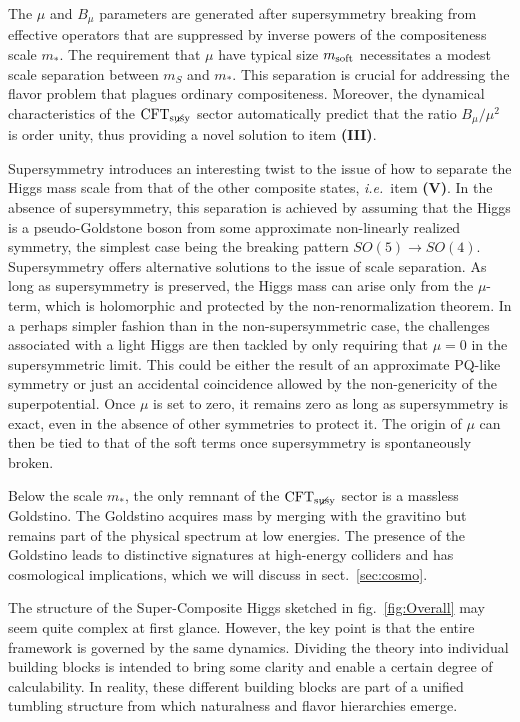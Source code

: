 \documentclass[a4paper,12pt]{article}
\def\fig#1{fig.~\ref{#1}}
\def\fig#1{fig.~\ref{#1}}
\def\sec#1{sect.~\ref{#1}}
\def\mst{m_*}
\def\mS{m_S}
\def\msoft{m_{\rm soft}}
\def\CFTs{{\rm CFT}_ {{\rm susy}\! \! \! \! \! \! \! \!\diagup \,\,\,}}
\begin{document}
The $\mu$ and $B_\mu$ parameters are generated after supersymmetry breaking from effective operators that are suppressed by inverse powers of the compositeness scale $\mst$. The requirement that $\mu$ have typical size $\msoft$ necessitates a modest scale separation between $\mS$ and $\mst$. This separation is crucial for addressing the flavor problem that plagues ordinary compositeness. Moreover, the dynamical characteristics of the $\CFTs$ sector automatically predict that the ratio $B_\mu/\mu^2$ is order unity, thus providing a novel solution to item \textbf{(III)}.

Supersymmetry introduces an interesting twist to the issue of how to separate the Higgs mass scale from that of the other composite states, {\it i.e.}~item \textbf{(V)}.  In the absence of supersymmetry,  this separation is achieved by assuming that the Higgs is a pseudo-Goldstone boson from some approximate non-linearly realized symmetry, the simplest case being the breaking pattern $SO(5)\to SO(4)$.
Supersymmetry offers alternative solutions to the issue of scale separation.
As long as supersymmetry is preserved, the Higgs mass can arise only from the $\mu$-term, which is holomorphic and protected by the non-renormalization theorem. In a perhaps  simpler fashion than in the non-supersymmetric case, the challenges associated with a light Higgs are then tackled by only requiring that $\mu=0$ in the supersymmetric limit. This could be either the result of an approximate PQ-like symmetry or just an accidental coincidence allowed by the non-genericity of the superpotential. Once $\mu$ is set to zero, it remains zero as long as supersymmetry is exact, even in the absence of other symmetries to protect it. The origin of $\mu$ can then be tied to that of the soft terms once supersymmetry is spontaneously broken.


Below the scale $\mst$, the only remnant of the $\CFTs$ sector is a massless Goldstino. The Goldstino acquires mass by merging with the gravitino but remains part of the physical spectrum at low energies. The presence of the Goldstino leads to distinctive signatures at high-energy colliders and has cosmological implications, which we will discuss in \sec{sec:cosmo}.

The structure of the Super-Composite Higgs sketched in \fig{fig:Overall} may seem quite complex at first glance. However, the key point is that the entire framework is governed by the same dynamics. Dividing the theory into individual building blocks is intended to bring some clarity and enable a certain degree of calculability. In reality, these different building blocks are part of a unified tumbling structure from which naturalness and flavor hierarchies emerge.
\end{document}
